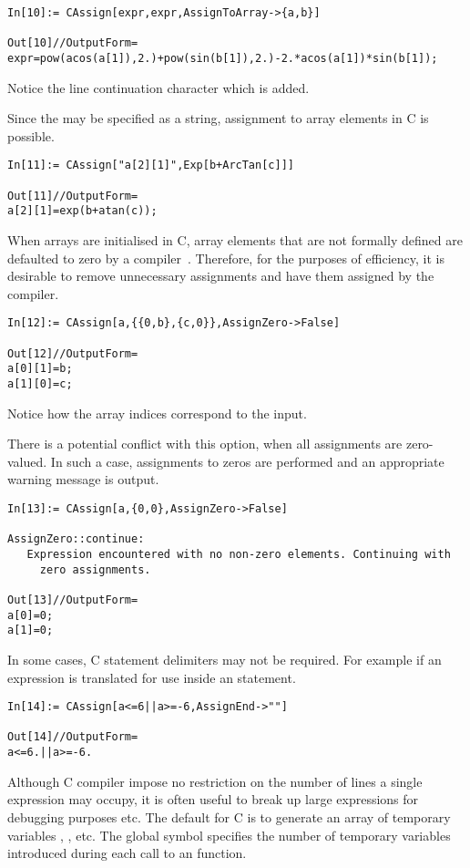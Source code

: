 \documentclass [12pt,twoside]{article}
\begin{document}
\begin{verbatim}
In[10]:= CAssign[expr,expr,AssignToArray->{a,b}]

Out[10]//OutputForm=
expr=pow(acos(a[1]),2.)+pow(sin(b[1]),2.)-2.*acos(a[1])*sin(b[1]);
\end{verbatim}
Notice the line continuation character which is added.

\noindent
Since the  may be specified as a string, assignment to array elements
in C is possible.
\begin{verbatim}
In[11]:= CAssign["a[2][1]",Exp[b+ArcTan[c]]]

Out[11]//OutputForm=
a[2][1]=exp(b+atan(c));
\end{verbatim}
When arrays are initialised in C, array elements that are not formally defined
are defaulted to zero by a compiler~\cite{harbison-91}. Therefore, for the purposes
of efficiency, it is desirable to remove unnecessary assignments and have them
assigned by the compiler.

\begin{verbatim}
In[12]:= CAssign[a,{{0,b},{c,0}},AssignZero->False]

Out[12]//OutputForm=
a[0][1]=b;
a[1][0]=c;
\end{verbatim}
Notice how the array indices correspond to the input.

\noindent
There is a potential conflict with this option, when all assignments are zero-valued.
In such a case, assignments to zeros are performed and an appropriate warning
message is output.
\begin{verbatim}
In[13]:= CAssign[a,{0,0},AssignZero->False]

AssignZero::continue: 
   Expression encountered with no non-zero elements. Continuing with
     zero assignments.

Out[13]//OutputForm=
a[0]=0;
a[1]=0;
\end{verbatim}
In some cases, C statement delimiters may not be required. For example if
an expression is translated for use inside an  statement.
\begin{verbatim}
In[14]:= CAssign[a<=6||a>=-6,AssignEnd->""]

Out[14]//OutputForm=
a<=6.||a>=-6.
\end{verbatim}
Although C compiler impose no restriction on the number of lines a single expression may
occupy, it is often useful to break up large expressions for debugging purposes etc.
The default for C is to generate an array of temporary variables , ,
etc. The global symbol  specifies the number of temporary
variables introduced during each call to an  function.
\end{document}
